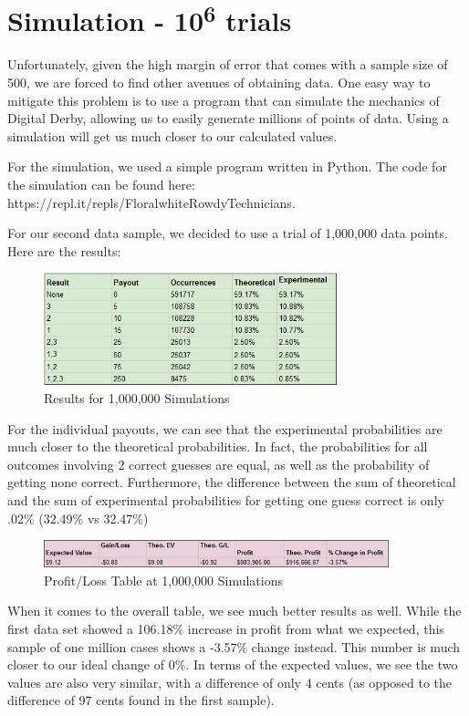 \documentclass{article}
\begin{document}
\section{Simulation - 10\textsuperscript{6} trials}
{
Unfortunately, given the high margin of error that comes with a sample size of 500, we are forced to find other avenues of obtaining data. One easy way to mitigate this problem is to use a program that can simulate the mechanics of Digital Derby, allowing us to easily generate millions of points of data. Using a simulation will get us much closer to our calculated values. 

\vspace{2ex}

For the simulation, we used a simple program written in Python. The code for the simulation can be found here: https://repl.it/repls/FloralwhiteRowdyTechnicians. 

\vspace{2ex}

For our second data sample, we decided to use a trial of 1,000,000 data points. Here are the results: 
\vspace{6ex}
\begin{figure}[h]
\centering
\includegraphics[width=8.5cm]{images/gameresults1m.png}
\caption{Results for 1,000,000 Simulations}
\end{figure}

For the individual payouts, we can see that the experimental probabilities are much closer to the theoretical probabilities. In fact, the probabilities for all outcomes involving 2 correct guesses are equal, as well as the probability of getting none correct. Furthermore, the difference between the sum of theoretical and the sum of experimental probabilities for getting one guess correct is only .02\% (32.49\% vs 32.47\%)

\vspace{2ex}

\begin{figure}[h]
\centering
\includegraphics[width=10cm]{images/profittable1m.png}
\caption{Profit/Loss Table at 1,000,000 Simulations}
\end{figure}
\vspace{2ex}
When it comes to the overall table, we see much better results as well. While the first data set showed a 106.18\% increase in profit from what we expected, this sample of one million cases shows a -3.57\% change instead. This number is much closer to our ideal change of 0\%. In terms of the expected values, we see the two values are also very similar, with a difference of only 4 cents (as opposed to the difference of 97 cents found in the first sample).

}
\end{document}
